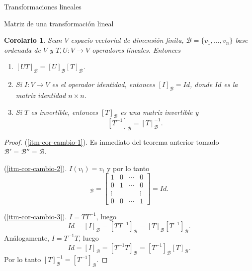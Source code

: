 \documentclass[a4paper,12pt,twoside,spanish]{amsbook}
\newtheorem{corolario}[teorema]{Corolario}
\theoremstyle{definition}
\theoremstyle{remark}
\begin{document}
\begin{chapter}{Transformaciones lineales}
\begin{section}{Matriz de una transformación lineal}
		\begin{corolario}\label{cor-5.6} Sean $V$ espacio vectorial de dimensión finita, $\mathcal B = \{v_1,\ldots,v_n\}$ base ordenada de $V$ y $T,U: V \to V$ operadores lineales. Entonces
			\begin{enumerate}
				\item\label{itm-cor-cambio-1} $[UT]_{\mathcal B} = [U]_{\mathcal B} [T]_{\mathcal B}$.
				\item\label{itm-cor-cambio-2} Si $I: V \to V$  es el operador identidad, entonces $[I]_{\mathcal B} =Id$,  donde $Id$  es la matriz identidad $n \times n$.
				\item\label{itm-cor-cambio-3} Si $T$  es invertible,  entonces $[T]_{\mathcal B}$  es una matriz invertible y  $$[T^{-1}]_{\mathcal B} = [T]_{\mathcal B}^{-1}.$$
			\end{enumerate}
		\end{corolario}
		\begin{proof}
			(\ref{itm-cor-cambio-1}). Es inmediato del teorema anterior tomado $\mathcal B' =\mathcal B'' = \mathcal B$. 
			
			(\ref{itm-cor-cambio-2}). $I(v_i) = v_i$ y por lo tanto
			\begin{equation*}
				[I]_{\mathcal B} = \begin{bmatrix} 1&0&\cdots&0 \\0&1&\cdots&0\\\vdots&&&\vdots\\0&0&\cdots&1 	\end{bmatrix} = Id.
			\end{equation*}
			
			
			(\ref{itm-cor-cambio-3}). $I = T T^{-1}$, luego
			\begin{equation*}
				Id = [I]_{\mathcal B} =  [T T^{-1}]_{\mathcal B} =  [T]_{\mathcal B} [T^{-1}]_{\mathcal B}.
			\end{equation*}
			 Análogamente, $I = T^{-1} T$, luego
			\begin{equation*}
			Id = [I]_{\mathcal B} =  [T^{-1} T]_{\mathcal B} =  [T^{-1}]_{\mathcal B} [T]_{\mathcal B}. 
			\end{equation*}
			Por  lo tanto $[T]_{\mathcal B}^{-1} = [T^{-1}]_{\mathcal B}$.
		\end{proof}	
	
	
			

\end{section}
\end{chapter}
\end{document}
